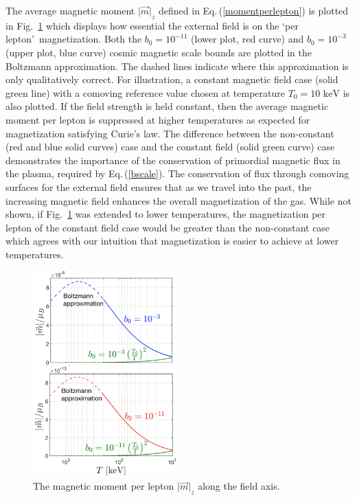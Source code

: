 \documentclass[a4paper]{article}
\newcommand*{\keV}{\text{ keV}}
\newcommand{\req}[1]{Eq.\,(\ref{#1})}
\newcommand{\rf}[1]{Fig.~{\ref{#1}}}
\begin{document}
The average magnetic moment $\vert\vec{m}\vert_{z}$ defined in \req{momentperlepton} is plotted in \rf{fig:momentperlepton} which displays how essential the external field is on the \lq per lepton\rq\ magnetization. Both the $b_{0}=10^{-11}$ (lower plot, red curve) and $b_{0}=10^{-3}$ (upper plot, blue curve) cosmic magnetic scale bounds are plotted in the Boltzmann approximation. The dashed lines indicate where this approximation is only qualitatively correct. For illustration, a constant magnetic field case (solid green line) with a comoving reference value chosen at temperature $T_{0}=10\keV$ is also plotted. If the field strength is held constant, then the average magnetic moment per lepton is suppressed at higher temperatures as expected for magnetization satisfying Curie's law. The difference between the non-constant (red and blue solid curves) case and the constant field (solid green curve) case demonstrates the importance of the conservation of primordial magnetic flux in the plasma, required by \req{bscale}. The conservation of flux through comoving surfaces for the external field ensures that as we travel into the past, the increasing magnetic field enhances the overall magnetization of the gas. While not shown, if \rf{fig:momentperlepton} was extended to lower temperatures, the magnetization per lepton of the constant field case would be greater than the non-constant case which agrees with our intuition that magnetization is easier to achieve at lower temperatures.

\begin{figure}[ht]
    \centering
    \includegraphics[width=0.5\textwidth]{plots/NewMagnetizationDensity004_Boltz.png}
    \caption{The magnetic moment per lepton $\vert\vec{m}\vert_{z}$ along the field axis.}
    \label{fig:momentperlepton}
\end{figure}
\end{document}

